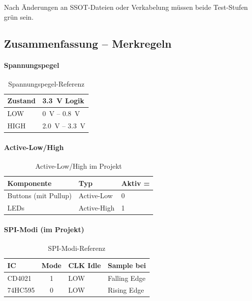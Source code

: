 \begin{warnbox}[Konsequenz]
Nach Änderungen an SSOT-Dateien oder Verkabelung müssen beide Test-Stufen grün sein.
\end{warnbox}

\subsection{Zusammenfassung – Merkregeln}

\paragraph{Spannungspegel}

\begin{table}[htbp]
\centering
\begin{tabular}{@{}ll@{}}
\toprule
\textbf{Zustand} & \textbf{\SI{3,3}{\volt} Logik} \\
\midrule
LOW  & \SI{0}{\volt} – \SI{0,8}{\volt} \\
HIGH & \SI{2,0}{\volt} – \SI{3,3}{\volt} \\
\bottomrule
\end{tabular}
\caption{Spannungspegel-Referenz}
\label{tab:pegel-referenz}
\end{table}

\paragraph{Active-Low/High}

\begin{table}[htbp]
\centering
\begin{tabular}{@{}lll@{}}
\toprule
\textbf{Komponente} & \textbf{Typ} & \textbf{Aktiv =} \\
\midrule
Buttons (mit Pullup) & Active-Low  & 0 \\
LEDs                 & Active-High & 1 \\
\bottomrule
\end{tabular}
\caption{Active-Low/High im Projekt}
\label{tab:active-referenz}
\end{table}

\paragraph{SPI-Modi (im Projekt)}

\begin{table}[htbp]
\centering
\begin{tabular}{@{}lcll@{}}
\toprule
\textbf{IC} & \textbf{Mode} & \textbf{CLK Idle} & \textbf{Sample bei} \\
\midrule
CD4021  & 1 & LOW & Falling Edge \\
74HC595 & 0 & LOW & Rising Edge \\
\bottomrule
\end{tabular}
\caption{SPI-Modi-Referenz}
\label{tab:spi-referenz}
\end{table}

